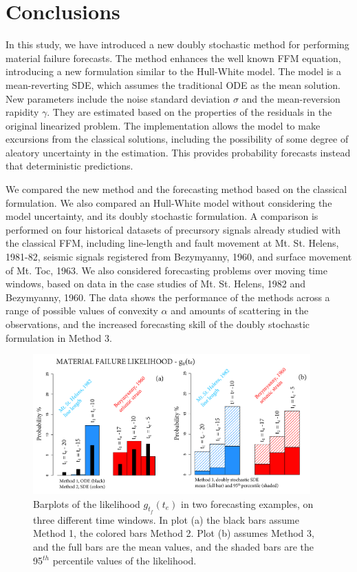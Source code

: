 \documentclass{article}
\begin{document}
\section{Conclusions}\label{s7}
In this study, we have introduced a new doubly stochastic method for performing material failure forecasts. The method enhances the well known FFM equation, introducing a new formulation similar to the Hull-White model. The model is a mean-reverting SDE, which assumes the traditional ODE as the mean solution. New parameters include the noise standard deviation $\sigma$ and the mean-reversion rapidity $\gamma$. They are estimated based on the properties of the residuals in the original linearized problem. The implementation allows the model to make excursions from the classical solutions, including the possibility of some degree of aleatory uncertainty in the estimation. This provides probability forecasts instead that deterministic predictions.

We compared the new method and the forecasting method based on the classical formulation. We also compared an Hull-White model without considering the model uncertainty, and its doubly stochastic formulation. A comparison is performed on four historical datasets of precursory signals already studied with the classical FFM, including line-length and fault movement at Mt. St. Helens, 1981-82, seismic signals registered from Bezymyanny, 1960, and surface movement of Mt. Toc, 1963. We also considered forecasting problems over moving time windows, based on data in the case studies of Mt. St. Helens, 1982 and Bezymyanny, 1960. The data shows the performance of the methods across a range of possible values of convexity $\alpha$ and amounts of scattering in the observations, and the increased forecasting skill of the doubly stochastic formulation in Method 3.

\begin{figure}[H]
\centering
\includegraphics[width=0.95\textwidth]{Fig16_plus.png}
\caption{Barplots of the likelihood $g_{t_f}(t_e)$ in two forecasting examples, on three different time windows. In plot (a) the black bars assume Method 1, the colored bars Method 2. Plot (b) assumes Method 3, and the full bars are the mean values, and the shaded bars are the 95$^{th}$ percentile values of the likelihood.}
\label{Fig16}
\end{figure}
\end{document}
